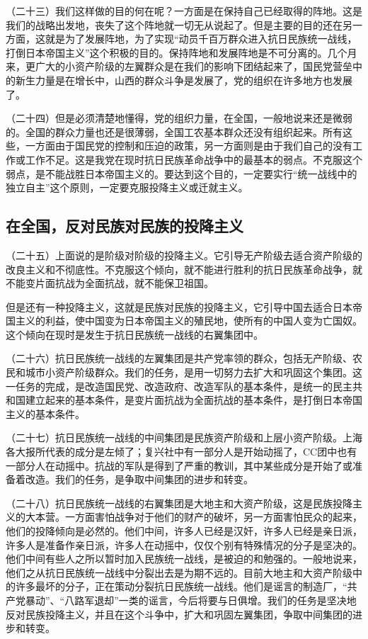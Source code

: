 （二十三）我们这样做的目的何在呢？一方面是在保持自己已经取得的阵地。这是我们的战略出发地，丧失了这个阵地就一切无从说起了。但是主要的目的还在另一方面，这就是为了发展阵地，为了实现“动员千百万群众进入抗日民族统一战线，打倒日本帝国主义”这个积极的目的。保持阵地和发展阵地是不可分离的。几个月来，更广大的小资产阶级的左翼群众是在我们的影响下团结起来了，国民党营垒中的新生力量是在增长中，山西的群众斗争是发展了，党的组织在许多地方也发展了。

（二十四）但是必须清楚地懂得，党的组织力量，在全国，一般地说来还是微弱的。全国的群众力量也还是很薄弱，全国工农基本群众还没有组织起来。所有这些，一方面由于国民党的控制和压迫的政策，另一方面则是由于我们自己的没有工作或工作不足。这是我党在现时抗日民族革命战争中的最基本的弱点。不克服这个弱点，是不能战胜日本帝国主义的。要达到这个目的，一定要实行“统一战线中的独立自主”这个原则，一定要克服投降主义或迁就主义。

\subsection{在全国，反对民族对民族的投降主义}

（二十五）上面说的是阶级对阶级的投降主义。它引导无产阶级去适合资产阶级的改良主义和不彻底性。不克服这个倾向，就不能进行胜利的抗日民族革命战争，就不能变片面抗战为全面抗战，就不能保卫祖国。

但是还有一种投降主义，这就是民族对民族的投降主义，它引导中国去适合日本帝国主义的利益，使中国变为日本帝国主义的殖民地，使所有的中国人变为亡国奴。这个倾向在现时是发生于抗日民族统一战线的右翼集团中。

（二十六）抗日民族统一战线的左翼集团是共产党率领的群众，包括无产阶级、农民和城市小资产阶级群众。我们的任务，是用一切努力去扩大和巩固这个集团。这一任务的完成，是改造国民党、改造政府、改造军队的基本条件，是统一的民主共和国建立起来的基本条件，是变片面抗战为全面抗战的基本条件，是打倒日本帝国主义的基本条件。

（二十七）抗日民族统一战线的中间集团是民族资产阶级和上层小资产阶级。上海各大报所代表的成分是左倾了；复兴社中有一部分人是开始动摇了，CC团中也有一部分人在动摇中。抗战的军队是得到了严重的教训，其中某些成分是开始了或准备着改造。我们的任务，是争取中间集团的进步和转变。

（二十八）抗日民族统一战线的右翼集团是大地主和大资产阶级，这是民族投降主义的大本营。一方面害怕战争对于他们的财产的破坏，另一方面害怕民众的起来，他们的投降倾向是必然的。他们中间，许多人已经是汉奸，许多人已经是亲日派，许多人是准备作亲日派，许多人在动摇中，仅仅个别有特殊情况的分子是坚决的。他们中间有些人之所以暂时加入民族统一战线，是被迫的和勉强的。一般地说来，他们之从抗日民族统一战线中分裂出去是为期不远的。目前大地主和大资产阶级中的许多最坏的分子，正在策动分裂抗日民族统一战线。他们是谣言的制造厂，“共产党暴动”、“八路军退却”一类的谣言，今后将要与日俱增。我们的任务是坚决地反对民族投降主义，并且在这个斗争中，扩大和巩固左翼集团，争取中间集团的进步和转变。

